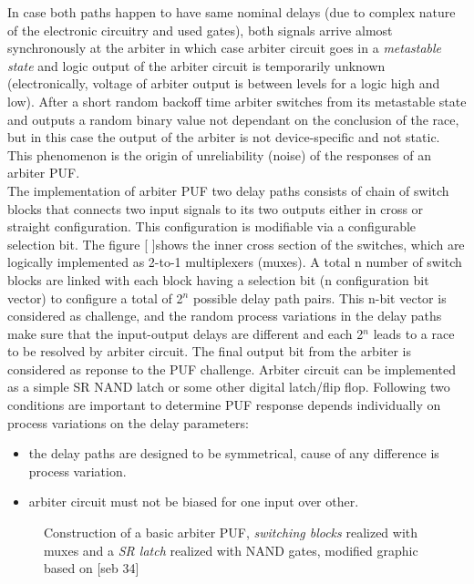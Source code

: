 In case both paths happen to have same nominal delays (due to complex nature of the electronic circuitry and used gates), both signals arrive almost synchronously at the arbiter in which case arbiter circuit goes in a \emph{metastable state} and logic output of the arbiter circuit is temporarily unknown (electronically, voltage of arbiter output is between levels for a logic high and low). After a short random backoff time arbiter switches from its metastable state and outputs a random binary value not dependant on the conclusion of the race, but in this case the output of the arbiter is not device-specific and not static. This phenomenon is the origin of unreliability (noise) of the responses of an arbiter PUF.\\

The implementation of arbiter PUF two delay paths consists of chain of switch blocks that connects two input signals to its two outputs either in cross or straight configuration. This configuration is modifiable via a configurable selection bit. The figure [ ]shows the inner cross section of the switches, which are logically implemented as 2-to-1 multiplexers (muxes). A total n number of switch blocks are linked with each block having a selection bit (n configuration bit vector) to
configure a total of 2$^n$ possible delay path pairs. This n-bit vector is considered as challenge, and the random process variations in the delay paths make sure that the input-output delays are different and each 2$^n$ leads to a race to be resolved by arbiter circuit. The final output bit from the arbiter is considered as reponse to the PUF challenge. Arbiter circuit can be implemented as a simple SR NAND latch or some other digital latch/flip flop. Following two conditions are
important to determine PUF response depends individually on process variations on the delay parameters:
\begin{itemize}
	\item the delay paths are designed to be symmetrical, cause of any difference is process variation.
	\item arbiter circuit must not be biased for one input over other.
\end{itemize}

\begin{figure}
	\centering
	\caption{Construction of a basic arbiter PUF, \emph{switching blocks} realized with muxes and a \emph{SR latch} realized with NAND gates, modified graphic based on [seb 34]}
	\label{img:1}
\end{figure}


